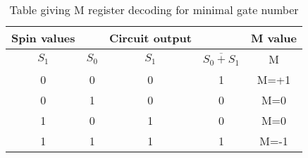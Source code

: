 \begin{table}[h]
\begin{tabular}{ |c c|c c|c| } 
\hline
 Spin values &&Circuit output &&M value \\
\hline
 $S_1$ &$S_0$ &$S_1$ &$\overline{S_0+S_1}$ &M \\
\hline
 0 &0 &0 &1 &M=+1 \\ 
 0 &1 &0 &0 &M=0 \\ 
 1 &0 &1 &0 &M=0 \\ 
 1 &1 &1 &1 &M=-1 \\ 
\hline 
\end{tabular}
\caption{Table giving M register decoding for minimal gate number}
\label{fig:tab}
\end{table}


